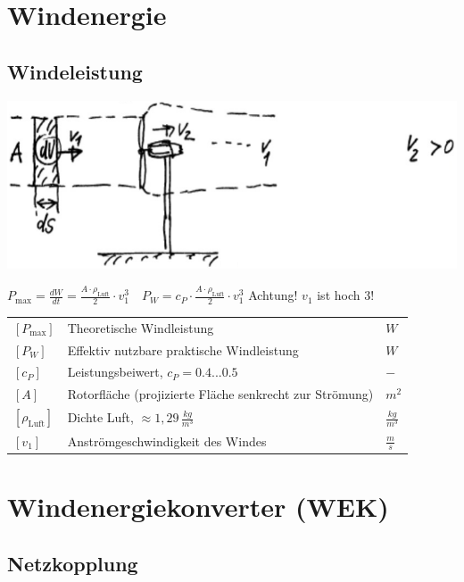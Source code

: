 \section{Windenergie}


\subsection{Windeleistung}

\includegraphics[width=0.95\columnwidth, align=c]{images/WEK_Leistungs-und_Drehzahlregelung.png}

$
\boxed{
P_{\text{max}} = \frac{dW}{dt} = \frac{A \cdot \rho_{\text{Luft}}}{2} \cdot v_1^3
}
\quad
\boxed{
P_W = c_P \cdot \frac{A \cdot \rho_{\text{Luft}}}{2} \cdot v_1^3
}
$ \quad Achtung! $v_1$ ist hoch 3!


\renewcommand{\arraystretch}{1.2}
\begin{tabular}{@{} l p{8cm} l @{}}
    $[P_{\text{max}}]$ & Theoretische Windleistung \dotfill & $W$ \\
    $[P_W]$            & Effektiv nutzbare praktische Windleistung \dotfill & $W$ \\
    $[c_P]$            & Leistungsbeiwert, $c_P = 0.4 ... 0.5$ \dotfill & $-$ \\
    $[A]$              & Rotorfläche (projizierte Fläche senkrecht zur Strömung) \dotfill & $m^2$ \\
    $[\rho_{\text{Luft}}]$ & Dichte Luft, $\approx 1{,}29 \, \frac{kg}{m^3}$ \dotfill & $\frac{kg}{m^3}$ \\
    $[v_1]$            & Anströmgeschwindigkeit des Windes \dotfill & $\frac{m}{s}$ \\
\end{tabular}



\section{Windenergiekonverter (WEK)}
\subsection{Netzkopplung}

